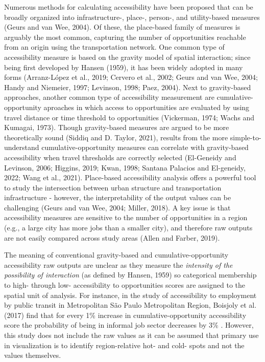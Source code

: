 \documentclass[]{elsarticle} %
\begin{document}
Numerous methods for calculating accessibility have been proposed that
can be broadly organized into infrastructure-, place-, person-, and
utility-based measures (Geurs and van Wee, 2004). Of these, the
place-based family of measures is arguably the most common, capturing
the number of opportunities reachable from an origin using the
transportation network. One common type of accessibility measure is
based on the gravity model of spatial interaction; since being first
developed by Hansen (1959), it has been widely adopted in many forms
(Arranz-López et al., 2019; Cervero et al., 2002; Geurs and van Wee,
2004; Handy and Niemeier, 1997; Levinson, 1998; Paez, 2004). Next to
gravity-based approaches, another common type of accessibility
measurement are cumulative-opportunity aproaches in which access to
opportunities are evaluated by using travel distance or time threshold
to opportunities (Vickerman, 1974; Wachs and Kumagai, 1973). Though
gravity-based measures are argued to be more theoretically sound (Siddiq
and D. Taylor, 2021), results from the more simple-to-understand
cumulative-opportunity measures can correlate with gravity-based
accessibility when travel thresholds are correctly selected (El-Geneidy
and Levinson, 2006; Higgins, 2019; Kwan, 1998; Santana Palacios and
El-geneidy, 2022; Wang et al., 2021). Place-based accessibility analysis
offers a powerful tool to study the intersection between urban structure
and transportation infrastructure - however, the interpretability of the
output values can be challenging (Geurs and van Wee, 2004; Miller,
2018). A key issue is that accessibility measures are sensitive to the
number of opportunities in a region (e.g., a large city has more jobs
than a smaller city), and therefore raw outputs are not easily compared
across study areas (Allen and Farber, 2019).

The meaning of conventional gravity-based and cumulative-opportunity
accessibility raw outputs are unclear as they measure the
\emph{intensity of the possibility of interaction} (as defined by
Hansen, 1959) so categorical membership to high- through low-
accessibility to opportunities scores are assigned to the spatial unit
of analysis. For instance, in the study of accessibility to employment
by public transit in Metropolitan São Paulo Metropolitan Region,
Boisjoly et al. (2017) find that for every 1\% increase in
cumulative-opportunity accessibility score the probability of being in
informal job sector decreases by 3\% . However, this study does not
include the raw values as it can be assumed that primary use in
visualization is to identify region-relative hot- and cold- spots and
not the values themselves.
\end{document}
